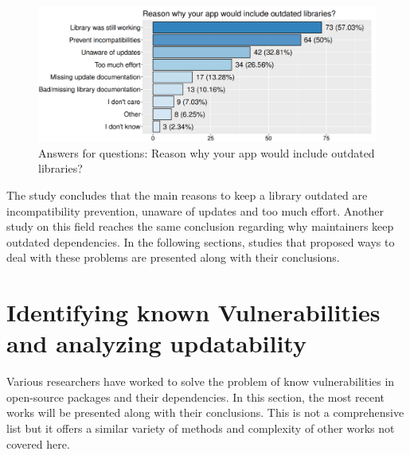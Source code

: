 \documentclass[pdf,bookmarks,colorlinks=true]{IEEEtran}
\begin{document}
\begin{figure}[h]
	\centering
	\includegraphics[scale=0.28]{ReasonsOutdatedLibrary.png}
	\caption{Answers for questions: Reason why your app would include outdated libraries?}
	\label{ReasonsOutdatedLibrary}
\end{figure}

The study concludes that the main reasons to keep a library outdated are incompatibility prevention, unaware of updates and too much effort. Another study on this field \cite{Kula2018} reaches the same conclusion regarding why maintainers keep outdated dependencies. In the following sections, studies that proposed ways to deal with these  problems are presented along with their conclusions.

\section{Identifying known Vulnerabilities and analyzing updatability}
\label{sec:IdentifyingknownVulnerabilities}

Various researchers have worked to solve the problem of know vulnerabilities in open-source packages and their dependencies. In this section, the most recent works will be presented along with their conclusions. This is not a comprehensive list but it offers a similar variety of methods and complexity of other works not covered here.
\end{document}
